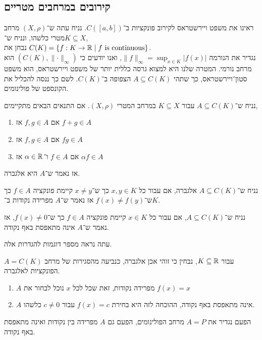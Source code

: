 \subsection{קירובים במרחבים מטריים}
ראינו את משפט ויירשטראס לקירוב פונקציות ב־$C([a, b])$.
נניח עתה ש־$(X, \rho)$ מרחב מטרי כלשהו, ונניח ש־$K \subseteq X$, \\
נבחן את $C(K) = \{ f : K \to \mathbb{R} \mid f \text{ is continuous} \}$. \\
נגדיר את הנורמה $\lVert f \rVert_\infty = \sup_{x \in K} |f(x)|$, ואנו יודעים כי $(C(K), \lVert \cdot \rVert_\infty)$ הוא מרחב נורמי.
המטרה שלנו היא למצוא גרסה כללית יותר של משפט ויירשטראס, הוא משפט סטון־ויירשטראס, כך שתהי $A \subseteq C(K)$ הצפופה ב־$C(K)$.
לשם כך ננסה להכליל את הקונספט של פולינומים.
\begin{definition}[אלגברה]
	נניח ש־$A \subseteq C(K)$ עבור $K \subseteq X$ במרחב המטרי $(X, \rho)$.
	אם התנאים הבאים מתקיימים,
	\begin{enumerate}
		\item אם $f, g \in A$ אז $f + g \in A$
		\item אם $f, g \in A$ אז $f g \in A$
		\item אם $f \in A$ ו־$\alpha \in \mathbb{R}$ אז $\alpha f \in A$
	\end{enumerate}
	אז נאמר ש־$A$ היא אלגברה.
\end{definition}
\begin{definition}
	נניח ש־$A \subseteq C(K)$ אלגברה,
	אם עבור כל $x, y \in K$ כך ש־$x \ne y$ קיימת פונקציה $f \in A$ כך ש־$f(x) \ne f(y)$ אז נאמר ש־$A$ מפרידה נקודות ב־$K$.
\end{definition}
\begin{definition}
	נניח ש־$A \subseteq C(K)$,
	אם עבור כל $x \in K$ קיימת פונקציה $f \in A$ כך ש־$f(x) \ne 0$, אז נאמר ש־$A$ אינה מתאפסת באף נקודה.
\end{definition}
עתה נראה מספר דוגמות להגדרות אלה.
\begin{example}
	$A = C(K)$ עבור $K \subseteq \mathbb{R}$, נבחין כי זוהי אכן אלגברה, כנביעה מהסגירות של מרחב הפונקציות לאלגברה.
	\begin{enumerate}
		\item $A$ מפרידה נקודות,
			זאת שכל לכל $x$ נוכל לבחור את $f(x) = x$
		\item $A$ אינה מתאפסת באף נקודה,
			ההוכחה לזה היא בחירת $f(x) = c$ עבור $c \ne 0$ כלשהו.
	\end{enumerate}
\end{example}
\begin{example}
	הפעם נגדיר את $A = P$ מרחב הפולינומים,
	הפעם גם $A$ מפרידה בין נקודות ואינה מתאפסת באף נקודה.
\end{example}
